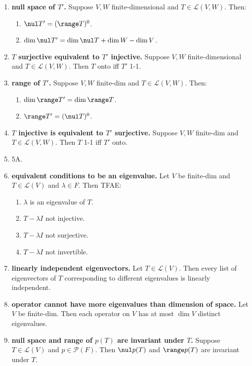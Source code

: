 \begin{enumerate}
\begin{enumerate}
	\end{enumerate}
	\item \textbf{null space of $T'$. } Suppose $V,W$ finite-dimensional and $T \in \mathscr{L}(V,W)$. Then: 
	\begin{enumerate}
		\item $\nul T' = (\range T)^0$. 
		\item $\dim \nul T' = \dim \nul T + \dim W - \dim V$. 
	\end{enumerate}
	\item \textbf{$T$ surjective equivalent to $T'$ injective. } Suppose $V,W$ finite-dimensional and $T \in \mathscr{L}(V,W)$. Then $T$ onto iff $T'$ 1-1. 
	\item \textbf{range of $T'$. } Suppose $V,W$ finite-dim and $T \in \mathscr{L}(V,W)$. Then: 
	\begin{enumerate}
		\item $\dim \range T' = \dim \range T$. 
		\item $\range T' = (\nul T)^0$. 
	\end{enumerate}
	\item \textbf{$T$ injective is equivalent to $T'$ surjective. } Suppose $V,W$ finite-dim and $T \in \mathscr{L}(V,W)$. Then $T$ 1-1 iff $T'$ onto. 
	\item 5A. 
	\item \textbf{equivalent conditions to be an eigenvalue. } Let $V$ be finite-dim and $T \in \mathscr{L}(V)$ and $\lambda \in F$. Then TFAE: 
	\begin{enumerate}
		\item $\lambda$ is an eigenvalue of $T$. 
		\item $T - \lambda I$ not injective. 
		\item $T - \lambda I$ not surjective. 
		\item $T - \lambda I$ not invertible. 
	\end{enumerate}
	\item \textbf{linearly independent eigenvectors. } Let $T \in \mathscr{L}(V)$. Then every list of eigenvectors of $T$ corresponding to different eigenvalues is linearly independent. 
	\item \textbf{operator cannot have more eigenvalues than dimension of space. } Let $V$ be finite-dim. Then each operator on $V$ has at most $\dim V$ distinct eigenvalues. 
	\item \textbf{null space and range of $p(T)$ are invariant under $T$. } Suppose $T \in \mathscr{L}(V)$ and $p \in \mathscr{P}(F)$. Then $\nul p(T)$ and $\range p(T)$ are invariant under $T$. 

\end{enumerate}
